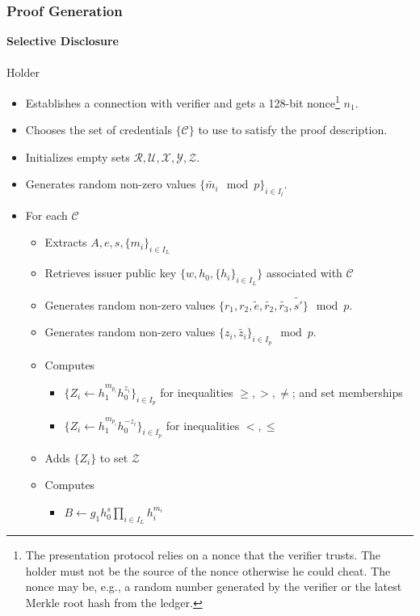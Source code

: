 \documentclass[a4paper]{article}
\begin{document}
\subsubsection{Proof Generation}
\textbf{Selective Disclosure}\\\\
Holder
\begin{itemize}
    \item Establishes a connection with verifier and gets a 128-bit nonce\footnote{The presentation protocol relies on a nonce that the verifier trusts. The holder must not be the source of the nonce otherwise he could cheat. The nonce may be, e.g., a random number generated by the verifier or the latest Merkle root hash from the ledger.} $n_1$.
    \item Chooses the set of credentials $\{\mathcal{C}\}$ to use to satisfy the proof description.
    \item Initializes empty sets $\mathcal{R}, \mathcal{U}, \mathcal{X}, \mathcal{Y}, \mathcal{Z}$.
    \item Generates random non-zero values $\{\widetilde{m_i} \mod p\}_{i \in I_l}$.
    \item For each $\mathcal{C}$
    \begin{itemize}
        \item Extracts $A, e, s, \{m_i\}_{i \in I_L}$
        \item Retrieves issuer public key $\{w, h_0, \{h_i\}_{i \in I_L}\}$ associated with $\mathcal{C}$
        \item Generates random non-zero values $\{r_1,r_2,\widetilde{e},\widetilde{r_2},\widetilde{r_3},\widetilde{s'}\} \mod p$.
        \item Generates random non-zero values $\{z_i,\widetilde{z_i}\}_{i\in I_p} \mod p$.
        \item Computes
            \begin{itemize}
                \item $\{Z_i \leftarrow h_1^{m_{p_i}}h_0^{z_i}\}_{i\in I_p}$ for inequalities $\geq, >,  \neq$; and set memberships
                \item $\{Z_i \leftarrow h_1^{m_{p_i}}h_0^{-z_i}\}_{i\in I_p}$ for inequalities $<, \leq$
            \end{itemize}
        \item Adds $\{Z_i\}$ to set $\mathcal{Z}$
        \item Computes
            \begin{itemize}
                \item $B \leftarrow g_1  h_0^{s}\prod_{i\in I_L} h_i^{m_i}$

\end{itemize}
\end{itemize}
\end{itemize}
\end{document}

